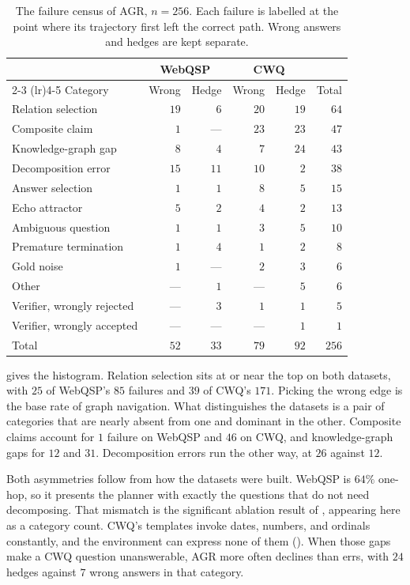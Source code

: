 \begin{table}[!t]
\caption{The failure census of AGR, $n = 256$. Each failure is labelled at the
  point where its trajectory first left the correct path. Wrong answers and
  hedges are kept separate.}
\label{tab:census}
\centering
\small
\setlength{\tabcolsep}{3pt}
\begin{tabular}{@{}lrrrrr@{}}
\toprule
& \multicolumn{2}{c}{WebQSP} & \multicolumn{2}{c}{CWQ} & \\
\cmidrule(lr){2-3} \cmidrule(lr){4-5}
Category & Wrong & Hedge & Wrong & Hedge & Total \\
\midrule
Relation selection & $19$ & $6$ & $20$ & $19$ & $64$ \\
Composite claim & $1$ & --- & $23$ & $23$ & $47$ \\
Knowledge-graph gap & $8$ & $4$ & $7$ & $24$ & $43$ \\
Decomposition error & $15$ & $11$ & $10$ & $2$ & $38$ \\
Answer selection & $1$ & $1$ & $8$ & $5$ & $15$ \\
Echo attractor & $5$ & $2$ & $4$ & $2$ & $13$ \\
Ambiguous question & $1$ & $1$ & $3$ & $5$ & $10$ \\
Premature termination & $1$ & $4$ & $1$ & $2$ & $8$ \\
Gold noise & $1$ & --- & $2$ & $3$ & $6$ \\
Other & --- & $1$ & --- & $5$ & $6$ \\
Verifier, wrongly rejected & --- & $3$ & $1$ & $1$ & $5$ \\
Verifier, wrongly accepted & --- & --- & --- & $1$ & $1$ \\
\midrule
Total & $52$ & $33$ & $79$ & $92$ & $256$ \\
\bottomrule
\end{tabular}
\end{table}

 gives the histogram. Relation selection sits at or near the
top on both datasets, with $25$ of WebQSP's $85$ failures and $39$ of CWQ's
$171$. Picking the wrong edge is the base rate of graph navigation. What
distinguishes the datasets is a pair of categories that are nearly absent from
one and dominant in the other. Composite claims account for $1$ failure on
WebQSP and $46$ on CWQ, and knowledge-graph gaps for $12$ and $31$.
Decomposition errors run the other way, at $26$ against $12$.

Both asymmetries follow from how the datasets were built. WebQSP is $64\%$
one-hop, so it presents the planner with exactly the questions that do not need
decomposing. That mismatch is the significant ablation result of
, appearing here as a category count. CWQ's templates invoke
dates, numbers, and ordinals constantly, and the environment can express none of
them (). When those gaps make a CWQ question unanswerable, AGR
more often declines than errs, with $24$ hedges against $7$ wrong answers in
that category.


